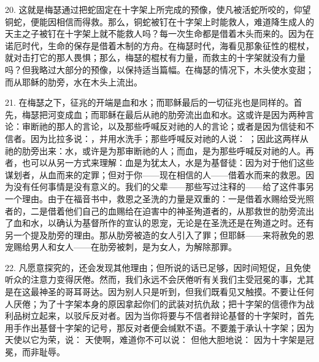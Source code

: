 20. 这就是梅瑟通过把蛇固定在十字架上所完成的预像，使凡被活蛇所咬的，仰望铜蛇，便能因相信而得救。那么，铜蛇被钉在十字架上时能救人，难道降生成人的天主之子被钉在十字架上就不能救人吗？每一次生命都是借着木头而来的。因为在诺厄时代，生命的保存是借着木制的方舟。在梅瑟时代，海看见那象征性的棍杖，就对击打它的那人畏惧；那么，梅瑟的棍杖有力量，而救主的十字架就没有力量吗？但我略过大部分的预像，以保持适当篇幅。在梅瑟的情况下，木头使水变甜；而从耶稣的肋旁，水在木头上流出。\par

21. 在梅瑟之下，征兆的开端是血和水；而耶稣最后的一切征兆也是同样的。首先，梅瑟把河变成血；而耶稣在最后从祂的肋旁流出血和水。这或许是因为两种言论：审断祂的那人的言论，以及那些呼喊反对祂的人的言论；或者是因为信徒和不信者。因为比拉多说：，并用水洗手；那些呼喊反对祂的人说： ；因此这两样从祂的肋旁出来：水，或许是为那审断祂的人；而血，是为那些呼喊反对祂的人。再者，也可以从另一方式来理解：血是为犹太人，水是为基督徒：因为对于他们这些谋划者，从血而来的定罪；但对于你——现在相信的人——借着水而来的救恩。因为没有任何事情是没有意义的。我们的父辈——那些写过注释的——给了这件事另一个理由。由于在福音书中，救恩之圣洗的力量是双重的：一是借着水赐给受光照者的，二是借着他们自己的血赐给在迫害中的神圣殉道者的，从那救世的肋旁流出了血和水，以确认为基督所作的宣认的恩宠，无论是在圣洗还是在殉道之时。还有另一个提及肋旁的理由。那从肋旁被造的女人引入了罪；但耶稣——来将赦免的恩宠赐给男人和女人——在肋旁被刺，是为女人，为解除那罪。\par

22. 凡愿意探究的，还会发现其他理由；但所说的话已足够，因时间短促，且免使听众的注意力变得厌倦。然而，我们永远不会厌倦听有关我们主受冠冕的事，尤其是在这最神圣的哥耳哥达。因为别人只是听到，但我们既看见又触摸。不要让任何人厌倦；为了十字架本身的原因拿起你们的武装对抗仇敌；把十字架的信德作为战利品树立起来，以驳斥反对者。因为当你将要与不信者辩论基督的十字架时，首先用手作出基督十字架的记号，那反对者便会缄默不语。不要羞于承认十字架；因为天使以它为荣，说：  天使啊，难道你不可以说： 但他大胆地说： 因为十字架是冠冕，而非耻辱。\par

